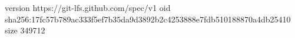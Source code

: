 version https://git-lfs.github.com/spec/v1
oid sha256:17fc57b789ac333f5ef7b35da9d3892b2c4253888e7fdb510188870a4db25410
size 349712
